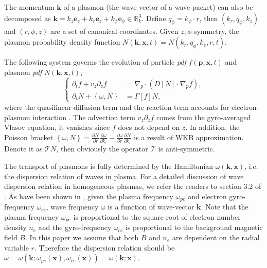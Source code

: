 \documentclass{article}
\numberwithin{equation}{section}
\begin{document}
The momentum  $\mathbf{k}$ of a plasmon (the wave vector of a wave packet) can also be decomposed as $\mathbf{k}=k_{z}\mathbf{e}_{z}+k_{r}\mathbf{e_{r}}+k_{\phi}\mathbf{e}_{\phi} \in  \mathbb{R}_{k}^{3}$. Define $q_{\phi} = k_{\phi}\cdot r$, then $(k_{r},q_{\phi},k_{z})$ and $(r, \phi, z)$ are a set of canonical coordinates. Given $z,\phi$-symmetry, the plasmon probability density function $N(\mathbf{k}, \mathbf{x}, t) = N(k_{r}, q_{\phi}, k_{z}, r, t)$.


\bigskip
The following system governs the evolution of particle \textit{pdf} $f(\mathbf{p}, \mathbf{x}, t)$ and plasmon \textit{pdf} $N(\mathbf{k}, \mathbf{x}, t)$,
\begin{equation} \label{kineticsytem}
\begin{cases}
    \partial_{t}f +v_{z}\partial_{z}f&=\nabla_{p}\cdot(D[N]\cdot\nabla_{p}f),\\
    \partial_{t}N +\left\{\omega,N\right\} &=\Gamma[f]N,
\end{cases}
\end{equation}
where the quasilinear diffusion term and the reaction term accounts for electron-plasmon interaction \cite{breizman_physics_2019}. The advection term $v_{z}\partial_{z}f$ comes from the gyro-averaged Vlasov equation, it vanishes since $f$ does not depend on $z$. In addition, the Poisson bracket $\left\{ \omega,N\right\} =\frac{\partial N}{\partial r}\frac{\partial\omega}{\partial k_{r}} - \frac{\partial\omega}{\partial r}\frac{\partial N}{\partial k_{r}}$ is a result of WKB approximation. Denote it as $\mathcal{T}N$, then obviously the operator $\mathcal{T}$ is anti-symmetric. 

The transport of plasmons is fully determined by the Hamiltonian $\omega(\mathbf{k}, \mathbf{x})$, i.e. the dispersion relation of waves in plasma. For a detailed discussion of wave dispersion relation in homogeneous plasmas, we refer the readers to section 3.2 of \cite{huang2023numerical}. As have been shown in \cite{huang2023numerical}, given the plasma frequency $\omega_{pe}$ and electron gyro-frequency $\omega_{ce}$, wave frequency $\omega$ is a function of wave-vector $\mathbf{k}$. Note that the plasma frequency $\omega_{pe}$ is proportional to the square root of electron number density $n_{e}$ and the gyro-frequency $\omega_{ce}$ is proportional to the
background magnetic field $B$. In this paper we assume that both $B$ and $n_{e}$ are dependent on the radial variable $r$. Therefore the dispersion relation should be $\omega = \omega(\mathbf{k}; \omega_{pe}(\mathbf{x}), \omega_{ce}(\mathbf{x})) = \omega(\mathbf{k}; \mathbf{x})$.
\end{document}
